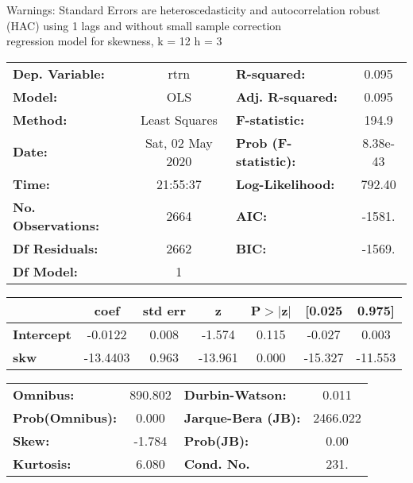 Warnings: \newline
 [1] Standard Errors are heteroscedasticity and autocorrelation robust (HAC) using 1 lags and without small sample correction\\ 

regression model for skewness, k = 12 h = 3\begin{center}
\begin{tabular}{lclc}
\toprule
\textbf{Dep. Variable:}    &       rtrn       & \textbf{  R-squared:         } &     0.095   \\
\textbf{Model:}            &       OLS        & \textbf{  Adj. R-squared:    } &     0.095   \\
\textbf{Method:}           &  Least Squares   & \textbf{  F-statistic:       } &     194.9   \\
\textbf{Date:}             & Sat, 02 May 2020 & \textbf{  Prob (F-statistic):} &  8.38e-43   \\
\textbf{Time:}             &     21:55:37     & \textbf{  Log-Likelihood:    } &    792.40   \\
\textbf{No. Observations:} &        2664      & \textbf{  AIC:               } &    -1581.   \\
\textbf{Df Residuals:}     &        2662      & \textbf{  BIC:               } &    -1569.   \\
\textbf{Df Model:}         &           1      & \textbf{                     } &             \\
\bottomrule
\end{tabular}
\begin{tabular}{lcccccc}
                   & \textbf{coef} & \textbf{std err} & \textbf{z} & \textbf{P$> |$z$|$} & \textbf{[0.025} & \textbf{0.975]}  \\
\midrule
\textbf{Intercept} &      -0.0122  &        0.008     &    -1.574  &         0.115        &       -0.027    &        0.003     \\
\textbf{skw}       &     -13.4403  &        0.963     &   -13.961  &         0.000        &      -15.327    &      -11.553     \\
\bottomrule
\end{tabular}
\begin{tabular}{lclc}
\textbf{Omnibus:}       & 890.802 & \textbf{  Durbin-Watson:     } &    0.011  \\
\textbf{Prob(Omnibus):} &   0.000 & \textbf{  Jarque-Bera (JB):  } & 2466.022  \\
\textbf{Skew:}          &  -1.784 & \textbf{  Prob(JB):          } &     0.00  \\
\textbf{Kurtosis:}      &   6.080 & \textbf{  Cond. No.          } &     231.  \\
\bottomrule
\end{tabular}
\end{center}

